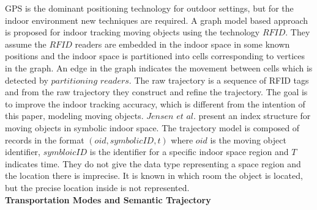 GPS is the dominant positioning technology for outdoor settings, but for the indoor 
environment new techniques are required. A graph model based approach \cite{JLY209} is 
proposed for indoor tracking moving objects using the technology $RFID$. 
They assume the $RFID$ readers are embedded in the indoor space in some known positions and 
the indoor space is partitioned into cells corresponding to vertices in the graph. 
An edge in the graph indicates the movement between cells which is detected by $partitioning$ 
$readers$. The raw trajectory is a sequence of RFID tags and from the raw trajectory they
construct and refine the trajectory. The goal is to improve 
the indoor tracking accuracy, which is different from the intention of this paper, modeling
moving objects. $Jensen$ $et$ $al.$ \cite{JLY109} present an index structure for moving objects 
in symbolic indoor space. The trajectory model is composed of records in the format 
$(oid,symbolicID,t)$ where $oid$ is the moving object identifier, $symbloicID$ is the 
identifier for a specific indoor space region and $T$ indicates time. They do not give the
data type representing a space region and the location there is imprecise. It is known
in which room the object is located, but the precise location inside is not represented. \\

\textbf{Transportation Modes and Semantic Trajectory} \\

